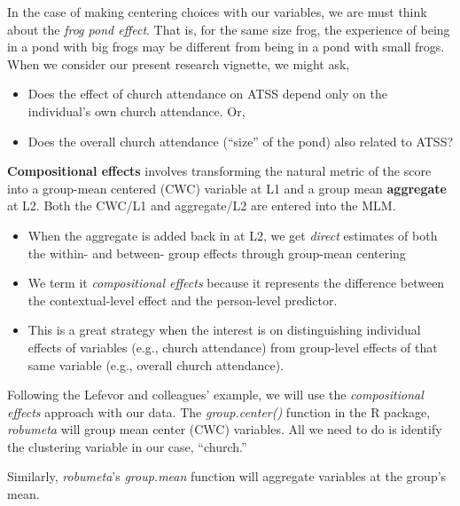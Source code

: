 \documentclass[
  english,
]{book}
\newenvironment{Shaded}{\begin{snugshade}}{\end{snugshade}}
\newcommand{\CommentTok}[1]{\textcolor[rgb]{0.56,0.35,0.01}{\textit{#1}}}
\newcommand{\FunctionTok}[1]{\textcolor[rgb]{0.00,0.00,0.00}{#1}}
\newcommand{\NormalTok}[1]{#1}
\newcommand{\OtherTok}[1]{\textcolor[rgb]{0.56,0.35,0.01}{#1}}
\newcommand{\SpecialCharTok}[1]{\textcolor[rgb]{0.00,0.00,0.00}{#1}}
\providecommand{\tightlist}{%
  \setlength{\itemsep}{0pt}\setlength{\parskip}{0pt}}
\begin{document}
In the case of making centering choices with our variables, we are must think about the \emph{frog pond effect}. That is, for the same size frog, the experience of being in a pond with big frogs may be different from being in a pond with small frogs. When we consider our present research vignette, we might ask,

\begin{itemize}
\tightlist
\item
  Does the effect of church attendance on ATSS depend only on the individual's own church attendance. Or,
\item
  Does the overall church attendance (``size'' of the pond) also related to ATSS?
\end{itemize}

\textbf{Compositional effects} \citep{enders_centering_2007} involves transforming the natural metric of the score into a group-mean centered (CWC) variable at L1 and a group mean \textbf{aggregate} at L2. Both the CWC/L1 and aggregate/L2 are entered into the MLM.

\begin{itemize}
\tightlist
\item
  When the aggregate is added back in at L2, we get \emph{direct} estimates of both the within- and between- group effects through group-mean centering
\item
  We term it \emph{compositional effects} because it represents the difference between the contextual-level effect and the person-level predictor.
\item
  This is a great strategy when the interest is on distinguishing individual effects of variables (e.g., church attendance) from group-level effects of that same variable (e.g., overall church attendance).
\end{itemize}

Following the Lefevor and colleagues' \citeyearpar{lefevor_homonegativity_2020} example, we will use the \emph{compositional effects} approach with our data. The \emph{group.center()} function in the R package, \emph{robumeta} will group mean center (CWC) variables. All we need to do is identify the clustering variable in our case, ``church.''

Similarly, \emph{robumeta}'s \emph{group.mean} function will aggregate variables at the group's mean.

\begin{Shaded}
\end{Shaded}
\end{document}
